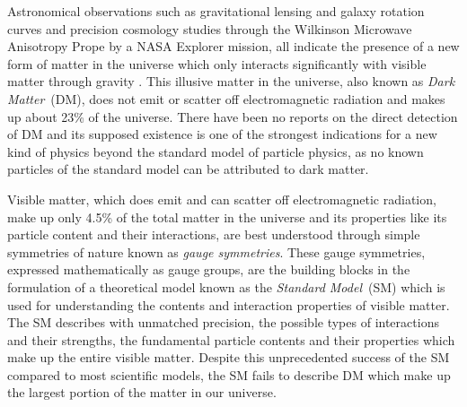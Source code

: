\par
  Astronomical observations such as gravitational lensing and galaxy rotation curves and precision cosmology studies through the Wilkinson Microwave Anisotropy Prope by a NASA Explorer mission, all indicate the presence of a new form of matter in the universe which only interacts significantly with visible matter through gravity \cite{DM}. This illusive matter in the universe, also known as \textit{Dark Matter}~(DM), does not emit or scatter off electromagnetic radiation and makes up about 23\% of the universe. There have been no reports on the direct detection of DM and its supposed existence is one of the strongest indications for a new kind of physics beyond the standard model of particle physics, as no known particles of the standard model can be attributed to dark matter. 
\par
Visible matter, which does emit and can scatter off electromagnetic radiation, make up only 4.5\% of the total matter in the universe and its properties like its particle content and their interactions, are best understood through simple symmetries of nature known as \textit{gauge symmetries}. These gauge symmetries, expressed mathematically as gauge groups, are the building blocks in the formulation of a theoretical model known as the \textit{Standard Model}~(SM) which is used for understanding the contents and interaction properties of visible matter. The SM describes with unmatched precision, the possible types of interactions and their strengths, the fundamental particle contents and their properties which make up the entire visible matter.  Despite this unprecedented success of the SM compared to most scientific models, the SM fails to describe DM which make up the largest portion of the matter in our universe. 
